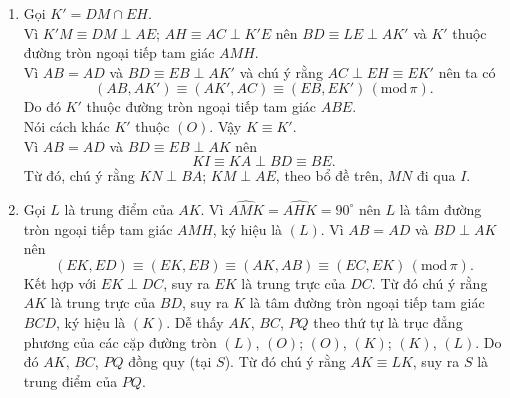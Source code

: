 \begin{bt}
{\begin{center}
		\end{center}
		\begin{enumerate}
			\item Gọi $K' = DM\cap EH$.\\
			Vì $K'M\equiv DM \perp AE$; $AH \equiv AC \perp K'E$ nên $BD\equiv LE\perp AK'$ và $K'$ thuộc đường tròn ngoại tiếp tam giác $AMH$.\\
			Vì $AB = AD$ và $BD\equiv EB\perp AK'$ và chú ý rằng $AC\perp EH\equiv EK'$ nên ta có 
			$$(AB,AK') \equiv (AK',AC)\equiv (EB,EK')\, (\text{mod}\, \pi ).$$
			Do đó $K'$ thuộc đường tròn ngoại tiếp tam giác $ABE$.\\
			Nói cách khác $K'$ thuộc $(O)$. Vậy $K\equiv K'$.\\
			Vì $AB = AD$ và $BD\equiv EB\perp AK$ nên 
			$$KI\equiv KA\perp BD\equiv BE.$$
			Từ đó, chú ý rằng $KN\perp BA$; $KM\perp AE$, theo bổ đề trên, $MN$ đi qua $I$.
			\item Gọi $L$ là trung điểm của $AK$. Vì $\widehat{AMK}=\widehat{AHK}=90^\circ$ nên $L$ là tâm đường tròn ngoại tiếp tam giác $AMH$, ký hiệu là $(L)$. Vì $AB = AD$ và $BD\perp AK$ nên
			$$(EK,ED)\equiv (EK,EB)\equiv (AK,AB)\equiv (EC,EK)\, (\text{mod}\, \pi ).$$
			Kết hợp với $EK\perp DC$, suy ra $EK$ là trung trực của $DC$. Từ đó chú ý rằng $AK$ là trung trực của $BD$, suy ra $K$ là tâm đường tròn ngoại tiếp tam giác $BCD$, ký hiệu là $(K)$.
			Dễ thấy $AK$, $BC$, $PQ$ theo thứ tự là trục đẳng phương của các cặp đường tròn $(L)$, $(O)$; $(O)$, $(K)$; $(K)$, $(L)$.
			Do đó $AK$, $BC$, $PQ$ đồng quy (tại $S$). Từ đó chú ý rằng $AK\equiv LK$, suy ra $S$ là trung điểm của $PQ$.
		\end{enumerate}
	}
\end{bt}
